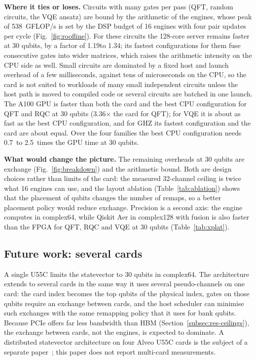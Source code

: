 \documentclass[pdflatex,sn-mathphys-num]{sn-jnl}
\newcommand{\NumFlagComputeRoof}{538}
\newcommand{\NumXplatBestGpuRatioQftThirty}{3.36}
\newcommand{\NumXplatCpuFasterOtherThirtyMax}{1.34}
\newcommand{\NumXplatCpuFasterOtherThirtyMin}{1.19}
\newcommand{\NumXplatGpuOverCpuThirtyMax}{2.5}
\newcommand{\NumXplatGpuOverCpuThirtyMin}{0.7}
\theoremstyle{thmstyleone}
\theoremstyle{thmstylethree}
\begin{document}
\textbf{Where it ties or loses.} Circuits with many gates per pass (QFT, random circuits, the VQE ansatz) are bound by the arithmetic of the engines, whose peak of \NumFlagComputeRoof~GFLOP/s is set by the DSP budget of 16 engines with four pair updates per cycle (Fig.~\ref{fig:roofline}). For these circuits the 128-core server remains faster at 30 qubits, by a factor of \NumXplatCpuFasterOtherThirtyMin to \NumXplatCpuFasterOtherThirtyMax; its fastest configurations for them fuse consecutive gates into wider matrices, which raises the arithmetic intensity on the CPU side as well. Small circuits are dominated by a fixed host and launch overhead of a few milliseconds, against tens of microseconds on the CPU, so the card is not suited to workloads of many small independent circuits unless the host path is moved to compiled code or several circuits are batched in one launch. The A100 GPU is faster than both the card and the best CPU configuration for QFT and RQC at 30 qubits (\NumXplatBestGpuRatioQftThirty$\times$ the card for QFT); for VQE it is about as fast as the best CPU configuration, and for GHZ its fastest configuration and the card are about equal. Over the four families the best CPU configuration needs \NumXplatGpuOverCpuThirtyMin~to \NumXplatGpuOverCpuThirtyMax~times the GPU time at 30 qubits.

\textbf{What would change the picture.} The remaining overheads at 30 qubits are exchange (Fig.~\ref{fig:breakdown}) and the arithmetic bound. Both are design choices rather than limits of the card: the measured 32-channel ceiling is twice what 16 engines can use, and the layout ablation (Table~\ref{tab:ablation}) shows that the placement of qubits changes the number of remaps, so a better placement policy would reduce exchange. Precision is a second axis: the engine computes in complex64, while Qiskit Aer in complex128 with fusion is also faster than the FPGA for QFT, RQC and VQE at 30 qubits (Table~\ref{tab:xplat}).


\subsection{Future work: several cards}\label{subsec:future-multifpga}

A single U55C limits the statevector to 30 qubits in complex64. The architecture extends to several cards in the same way it uses several pseudo-channels on one card: the card index becomes the top qubits of the physical index, gates on those qubits require an exchange between cards, and the host scheduler can minimise such exchanges with the same remapping policy that it uses for bank qubits. Because PCIe offers far less bandwidth than HBM (Section~\ref{subsec:res-ceilings}), the exchange between cards, not the engines, is expected to dominate. A distributed statevector architecture on four Alveo U55C cards is the subject of a separate paper~\cite{ali2026multifpga}; this paper does not report multi-card measurements.
\end{document}
